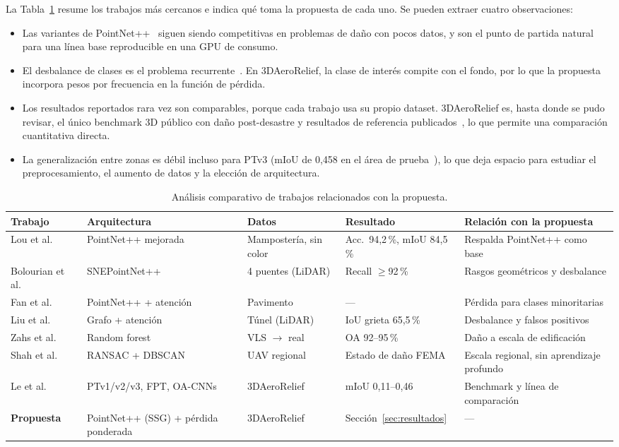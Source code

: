 \documentclass[5p]{elsarticle}
\begin{document}
La Tabla~\ref{tab:comparativa} resume los trabajos más cercanos e indica qué toma la propuesta de cada uno. Se pueden extraer cuatro observaciones:
\begin{itemize}
    \item Las variantes de PointNet++~\cite{Lou2025,Bolourian2023,Fan2024} siguen siendo competitivas en problemas de daño con pocos datos, y son el punto de partida natural para una línea base reproducible en una GPU de consumo.
    \item El desbalance de clases es el problema recurrente~\cite{Fan2024,Liu2025,Bolourian2023}. En 3DAeroRelief, la clase de interés compite con el fondo, por lo que la propuesta incorpora pesos por frecuencia en la función de pérdida.
    \item Los resultados reportados rara vez son comparables, porque cada trabajo usa su propio dataset. 3DAeroRelief es, hasta donde se pudo revisar, el único benchmark 3D público con daño post-desastre y resultados de referencia publicados~\cite{Le2026}, lo que permite una comparación cuantitativa directa.
    \item La generalización entre zonas es débil incluso para PTv3 (mIoU de 0,458 en el área de prueba~\cite{Le2026}), lo que deja espacio para estudiar el preprocesamiento, el aumento de datos y la elección de arquitectura.
\end{itemize}

\begin{table}[t]
\centering
\caption{Análisis comparativo de trabajos relacionados con la propuesta.}\label{tab:comparativa}
\footnotesize
\begin{tabular}{@{}p{2.1cm}p{2.5cm}p{2.3cm}p{2.3cm}p{3.1cm}@{}}
\toprule
Trabajo & Arquitectura & Datos & Resultado & Relación con la propuesta \\
\midrule
Lou et al.~\cite{Lou2025} & PointNet++ mejorada & Mampostería, sin color & Acc.\ 94,2\,\%, mIoU 84,5\,\% & Respalda PointNet++ como base \\
Bolourian et al.~\cite{Bolourian2023} & SNEPointNet++ & 4 puentes (LiDAR) & Recall $\geq$92\,\% & Rasgos geométricos y desbalance \\
Fan et al.~\cite{Fan2024} & PointNet++ + atención & Pavimento & --- & Pérdida para clases minoritarias \\
Liu et al.~\cite{Liu2025} & Grafo + atención & Túnel (LiDAR) & IoU grieta 65,5\,\% & Desbalance y falsos positivos \\
Zahs et al.~\cite{Zahs2023} & Random forest & VLS $\rightarrow$ real & OA 92--95\,\% & Daño a escala de edificación \\
Shah et al.~\cite{Shah2025} & RANSAC + DBSCAN & UAV regional & Estado de daño FEMA & Escala regional, sin aprendizaje profundo \\
Le et al.~\cite{Le2026} & PTv1/v2/v3, FPT, OA-CNNs & 3DAeroRelief & mIoU 0,11--0,46 & Benchmark y línea de comparación \\
\textbf{Propuesta} & PointNet++ (SSG) + pérdida ponderada & 3DAeroRelief & Sección~\ref{sec:resultados} & --- \\
\bottomrule
\end{tabular}
\end{table}
\end{document}
